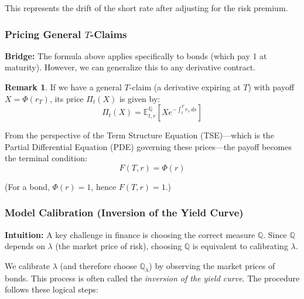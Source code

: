 \documentclass[12pt,a4paper]{article}
\theoremstyle{definition}
\newtheorem{remark}{Remark}[section]
\newcommand{\Q}{\mathbb{Q}}
\newcommand{\E}{\mathbb{E}}
\begin{document}
This represents the drift of the short rate after adjusting for the risk premium.

\subsubsection{Pricing General $T$-Claims}

\textbf{Bridge:} The formula above applies specifically to bonds (which pay 1 at maturity). However, we can generalize this to any derivative contract.

\begin{remark}
If we have a general $T$-claim (a derivative expiring at $T$) with payoff $X = \Phi(r_T)$, its price $\Pi_t(X)$ is given by:
\[
\Pi_t(X) = \E_{t,r}^{\Q}\left[X e^{-\int_t^T r_s \, ds}\right]
\]

From the perspective of the Term Structure Equation (TSE)—which is the Partial Differential Equation (PDE) governing these prices—the payoff becomes the terminal condition:
\[
F(T,r) = \Phi(r)
\]

(For a bond, $\Phi(r) = 1$, hence $F(T,r) = 1$.)
\end{remark}

\subsubsection{Model Calibration (Inversion of the Yield Curve)}

\textbf{Intuition:} A key challenge in finance is choosing the correct measure $\Q$. Since $\Q$ depends on $\lambda$ (the market price of risk), choosing $\Q$ is equivalent to calibrating $\lambda$.

We calibrate $\lambda$ (and therefore choose $\Q_\lambda$) by observing the market prices of bonds. This process is often called the \textit{inversion of the yield curve}. The procedure follows these logical steps:
\end{document}
